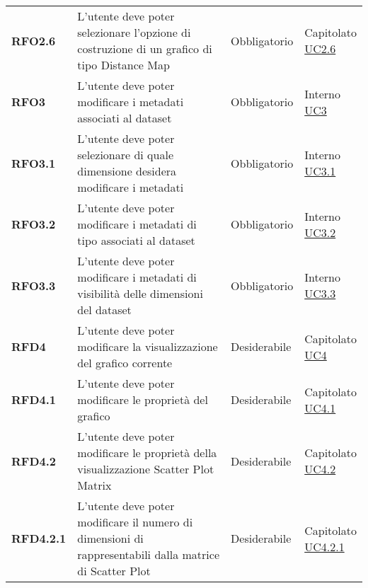 \begin{longtable}[H]{| >{\raggedright\bfseries}m{20mm} | >{\raggedright}m{90mm} | >{\centering}m{25mm} | >{\centering\arraybackslash}m{30mm}|}
    RFO2.6
    & L'utente deve poter selezionare l'opzione di costruzione di un grafico di tipo Distance Map
    & Obbligatorio
    & \makecell{Capitolato \\ \hyperref[ssub:uc2.6]{UC2.6}}\\

    RFO3
    & L'utente deve poter modificare i metadati associati al dataset
    & Obbligatorio
    & \makecell{ Interno \\  \hyperref[sub:uc3]{UC3} }\\

    RFO3.1
    & L'utente deve poter selezionare di quale dimensione desidera modificare i metadati
    & Obbligatorio
    & \makecell{ Interno \\\hyperref[ssub:uc3.1]{UC3.1} }\\

    RFO3.2
    & L'utente deve poter modificare i metadati di tipo associati al dataset
    & Obbligatorio
    & \makecell{ Interno \\\hyperref[ssub:uc3.2]{UC3.2} }\\

    RFO3.3
    & L'utente deve poter modificare i metadati di visibilità delle dimensioni del dataset
    & Obbligatorio
    & \makecell{ Interno \\  \hyperref[ssub:uc3.3]{UC3.3} }\\

    RFD4
    & L'utente deve poter modificare la visualizzazione del grafico corrente
    & Desiderabile
    & \makecell{ Capitolato \\ \hyperref[sub:uc4]{UC4} }\\

    RFD4.1
    & L'utente deve poter modificare le proprietà del grafico
    & Desiderabile
    & \makecell{ Capitolato \\ \hyperref[ssub:uc4.1]{UC4.1} }\\

    RFD4.2
    & L'utente deve poter modificare le proprietà della visualizzazione Scatter Plot Matrix
    & Desiderabile
    & \makecell{ Capitolato \\ \hyperref[ssub:uc4.2]{UC4.2} }\\

    RFD4.2.1
    & L'utente deve poter modificare il numero di dimensioni di rappresentabili dalla matrice di Scatter Plot
    & Desiderabile
    & \makecell{ Capitolato \\ \hyperref[par:uc4.2.1]{UC4.2.1} }\\


\end{longtable}

